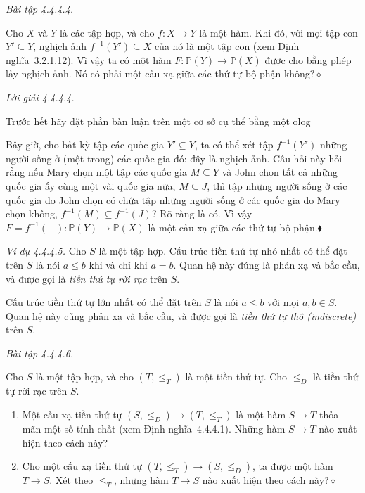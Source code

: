 \noindent\textit{Bài tập 4.4.4.4.}\keepwithnext

Cho $X$ và $Y$ là các tập hợp, và cho $f:X\to Y$ là một hàm. Khi đó, với mọi tập con $Y'\subseteq Y$, nghịch ảnh $f^{-1}(Y')\subseteq X$ của nó là một tập con (xem Định nghĩa~3.2.1.12). Vì vậy ta có một hàm $F:\mathbb{P}(Y)\to\mathbb{P}(X)$ được cho bằng phép lấy nghịch ảnh. Nó có phải một cấu xạ giữa các thứ tự bộ phận không?\hfill$\diamond$

\noindent\textit{Lời giải 4.4.4.4.}\keepwithnext

Trước hết hãy đặt phần bàn luận trên một cơ sở cụ thể bằng một olog
\begin{center}
\end{center}

Bây giờ, cho bất kỳ tập các quốc gia $Y'\subseteq Y$, ta có thể xét tập $f^{-1}(Y')$ những người sống ở (một trong) các quốc gia đó: đây là nghịch ảnh. Câu hỏi này hỏi rằng nếu Mary chọn một tập các quốc gia $M\subseteq Y$ và John chọn tất cả những quốc gia ấy cùng một vài quốc gia nữa, $M\subseteq J$, thì tập những người sống ở các quốc gia do John chọn có chứa tập những người sống ở các quốc gia do Mary chọn không, $f^{-1}(M)\subseteq f^{-1}(J)$? Rõ ràng là có. Vì vậy $F=f^{-1}(-):\mathbb{P}(Y)\to\mathbb{P}(X)$ là một cấu xạ giữa các thứ tự bộ phận.\hfill$\blacklozenge$

\noindent\textit{Ví dụ 4.4.4.5.} Cho $S$ là một tập hợp. Cấu trúc tiền thứ tự nhỏ nhất có thể đặt trên $S$ là nói $a\le b$ khi và chỉ khi $a=b$. Quan hệ này đúng là phản xạ và bắc cầu, và được gọi là \emph{tiền thứ tự rời rạc} trên $S$.

Cấu trúc tiền thứ tự lớn nhất có thể đặt trên $S$ là nói $a\le b$ với mọi $a,b\in S$. Quan hệ này cũng phản xạ và bắc cầu, và được gọi là \emph{tiền thứ tự thô (indiscrete)} trên $S$.

\noindent\textit{Bài tập 4.4.4.6.}\keepwithnext

Cho $S$ là một tập hợp, và cho $(T,\le_T)$ là một tiền thứ tự. Cho $\le_D$ là tiền thứ tự rời rạc trên $S$.
\begin{enumerate}[label=\alph*.]
\item Một cấu xạ tiền thứ tự $(S,\le_D)\to(T,\le_T)$ là một hàm $S\to T$ thỏa mãn một số tính chất (xem Định nghĩa~4.4.4.1). Những hàm $S\to T$ nào xuất hiện theo cách này?
\item Cho một cấu xạ tiền thứ tự $(T,\le_T)\to(S,\le_D)$, ta được một hàm $T\to S$. Xét theo $\le_T$, những hàm $T\to S$ nào xuất hiện theo cách này?\nobreak\hfill$\diamond$
\end{enumerate}

